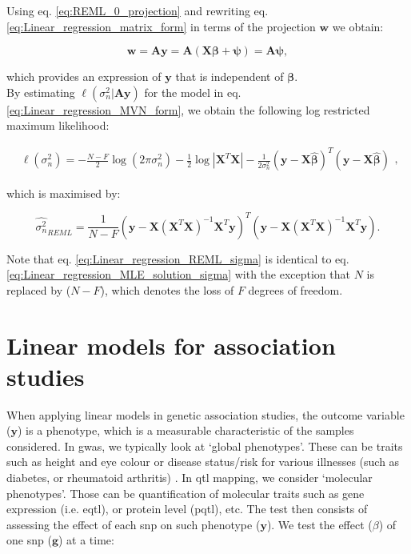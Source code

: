 Using eq. \eqref{eq:REML_0_projection} and rewriting eq. \eqref{eq:Linear_regression_matrix_form} in terms of the projection $\mathbf{w}$ we obtain:

\begin{equation}\label{eq:REML_w_projection}
    \mathbf{w} = \mathbf{A}\mathbf{y} = \mathbf{A}(\mathbf{X}\boldsymbol{\beta} + \boldsymbol{\psi}) = \mathbf{A}\boldsymbol{\psi},
\end{equation}

which provides an expression of $\mathbf{y}$ that is independent of $\boldsymbol{\beta}$.\\

By estimating $\ell(\sigma_n^2 | \mathbf{A}\mathbf{y} )$ for the model in eq. \eqref{eq:Linear_regression_MVN_form}, we obtain the following log restricted maximum likelihood:

\begin{equation} \label{eq:Linear_regression_log_restricted_likelihood}
\begin{split}
\ell(\sigma_n^2) = -\frac{N-F}{2}\log (2\pi\sigma_n^2) - \frac{1}{2}\log |\mathbf{X}^T\mathbf{X}| 
- \frac{1}{2\sigma_n^2}(\mathbf{y}-\mathbf{X}\hat{\boldsymbol{\beta}})^T(\mathbf{y}-\mathbf{X}\hat{\boldsymbol{\beta}})  
\end{split},
\end{equation}

which is maximised by:

\begin{equation}\label{eq:Linear_regression_REML_sigma}
\hat{\sigma_n^2}_{REML} =  \frac{1}{N-F}(\mathbf{y}-\mathbf{X}(\mathbf{X}^T\mathbf{X})^{-1}\mathbf{X}^T\mathbf{y})^T(\mathbf{y}-\mathbf{X}(\mathbf{X}^T\mathbf{X})^{-1}\mathbf{X}^T\mathbf{y}).
\end{equation}

Note that eq. \eqref{eq:Linear_regression_REML_sigma} is identical to eq. \eqref{eq:Linear_regression_MLE_solution_sigma} with the exception that $N$ is replaced by ($N-F$), which denotes the loss of $F$ degrees of freedom.


\section{Linear models for association studies}
\label{sec:linear_models_genetics}

When applying linear models in genetic association studies, the outcome variable ($\mathbf{y}$) is a phenotype, which is a measurable characteristic of the samples considered. 
In \gls{gwas}, we typically look at `global phenotypes'.
These can be traits such as height and eye colour or disease status/risk for various illnesses (such as diabetes, or rheumatoid arthritis) \cite{mccarthy2008genome}.
In \gls{qtl} mapping, we consider `molecular phenotypes'. 
Those can be quantification of molecular traits such as gene expression (i.e. e\gls{qtl}), or protein level (p\gls{qtl}), etc.
The test then consists of assessing the effect of each \gls{snp} on such phenotype ($\mathbf{y}$). 
We test the effect ($\beta$) of one \gls{snp} ($\mathbf{g}$) at a time:

